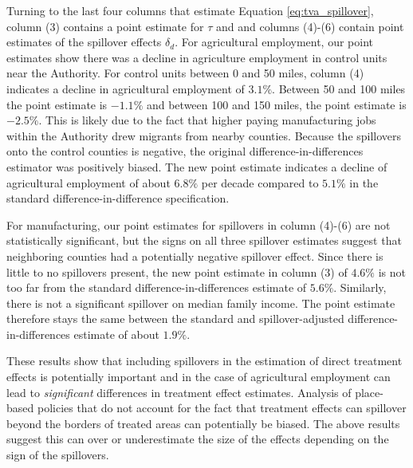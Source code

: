 \documentclass[11pt]{article}
\begin{document}
Turning to the last four columns that estimate Equation \ref{eq:tva_spillover}, column (3) contains a point estimate for $\tau$ and and columns (4)-(6) contain point estimates of the spillover effects $\delta_d$. For agricultural employment, our point estimates show there was a decline in agriculture employment in control units near the Authority. For control units between 0 and 50 miles, column (4) indicates a decline in agricultural employment of $3.1\%$. Between 50 and 100 miles the point estimate is $-1.1\%$ and between 100 and 150 miles, the point estimate is $-2.5\%$. This is likely due to the fact that higher paying manufacturing jobs within the Authority drew migrants from nearby counties. Because the spillovers onto the control counties is negative, the original difference-in-differences estimator was positively biased. The new point estimate indicates a decline of agricultural employment of about $6.8\%$ per decade compared to $5.1\%$ in the standard difference-in-difference specification. 

For manufacturing, our point estimates for spillovers in column (4)-(6) are not statistically significant, but the signs on all three spillover estimates suggest that neighboring counties had a potentially negative spillover effect. Since there is little to no spillovers present, the new point estimate in column (3) of $4.6\%$ is not too far from the standard difference-in-differences estimate of $5.6\%$. Similarly, there is not a significant spillover on median family income. The point estimate therefore stays the same between the standard and spillover-adjusted difference-in-differences estimate of about $1.9\%$. 

These results show that including spillovers in the estimation of direct treatment effects is potentially important and in the case of agricultural employment can lead to \emph{significant} differences in treatment effect estimates. Analysis of place-based policies that do not account for the fact that treatment effects can spillover beyond the borders of treated areas can potentially be biased. The above results suggest this can over or underestimate the size of the effects depending on the sign of the spillovers. 






\newpage \printbibliography%
\end{document}

